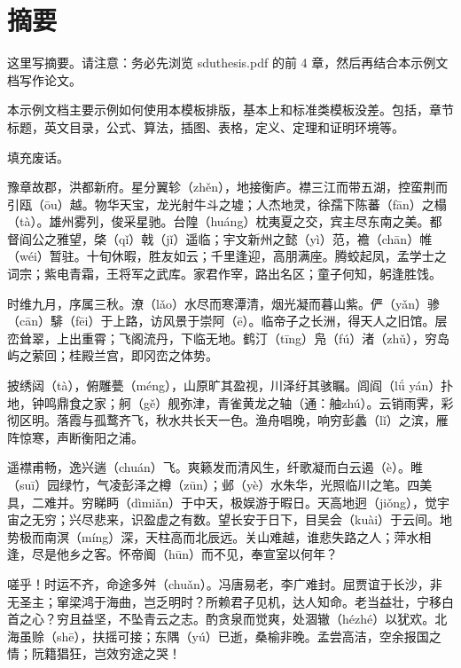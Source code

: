 
\chapter{摘\hspace{1em}要}
这里写摘要。请注意：务必先浏览 sduthesis.pdf 的前 4 章，然后再结合本示例文档写作论文。

本示例文档主要示例如何使用本模板排版，基本上和标准类模板没差。包括，章节标题，英文目录，公式、算法，插图、表格，定义、定理和证明环境等。

填充废话。

豫章故郡，洪都新府。星分翼轸（zhěn），地接衡庐。襟三江而带五湖，控蛮荆而引瓯（ōu）越。物华天宝，龙光射牛斗之墟；人杰地灵，徐孺下陈蕃（fān）之榻（tà）。雄州雾列，俊采星驰。台隍（huáng）枕夷夏之交，宾主尽东南之美。都督阎公之雅望，棨（qǐ）戟（jǐ）遥临；宇文新州之懿（yì）范，襜（chān）帷（wéi）暂驻。十旬休暇，胜友如云；千里逢迎，高朋满座。腾蛟起凤，孟学士之词宗；紫电青霜，王将军之武库。家君作宰，路出名区；童子何知，躬逢胜饯。

时维九月，序属三秋。潦（lǎo）水尽而寒潭清，烟光凝而暮山紫。俨（yǎn）骖（cān）騑（fēi）于上路，访风景于崇阿（ē）。临帝子之长洲，得天人之旧馆。层峦耸翠，上出重霄；飞阁流丹，下临无地。鹤汀（tīng）凫（fú）渚（zhǔ），穷岛屿之萦回；桂殿兰宫，即冈峦之体势。

披绣闼（tà），俯雕甍（méng），山原旷其盈视，川泽纡其骇瞩。闾阎（lǘ yán）扑地，钟鸣鼎食之家；舸（gě）舰弥津，青雀黄龙之轴（通：舳zhú）。云销雨霁，彩彻区明。落霞与孤鹜齐飞，秋水共长天一色。渔舟唱晚，响穷彭蠡（lǐ）之滨，雁阵惊寒，声断衡阳之浦。

遥襟甫畅，逸兴遄（chuán）飞。爽籁发而清风生，纤歌凝而白云遏（è）。睢（suī）园绿竹，气凌彭泽之樽（zūn）；邺（yè）水朱华，光照临川之笔。四美具，二难并。穷睇眄（dìmiǎn）于中天，极娱游于暇日。天高地迥（jiǒng），觉宇宙之无穷；兴尽悲来，识盈虚之有数。望长安于日下，目吴会（kuài）于云间。地势极而南溟（míng）深，天柱高而北辰远。关山难越，谁悲失路之人；萍水相逢，尽是他乡之客。怀帝阍（hūn）而不见，奉宣室以何年？

嗟乎！时运不齐，命途多舛（chuǎn）。冯唐易老，李广难封。屈贾谊于长沙，非无圣主；窜梁鸿于海曲，岂乏明时？所赖君子见机，达人知命。老当益壮，宁移白首之心？穷且益坚，不坠青云之志。酌贪泉而觉爽，处涸辙（hézhé）以犹欢。北海虽赊（shē），扶摇可接；东隅（yú）已逝，桑榆非晚。孟尝高洁，空余报国之情；阮籍猖狂，岂效穷途之哭！

